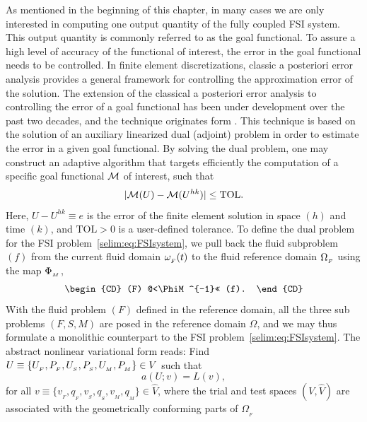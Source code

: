 As mentioned in the beginning of this chapter, in many cases we are
only interested in computing one output quantity of the fully coupled
FSI system. This output quantity is commonly referred to as the goal
functional.  To assure a high level of accuracy of the functional of
interest, the error in the goal functional needs to be controlled. In
finite element discretizations, classic a posteriori error analysis
provides a general framework for controlling the approximation error
of the solution.  The extension of the classical a posteriori error
analysis to controlling the error of a goal functional has been under
development over the past two decades, and the technique originates
form \citet{ErikssonEstepHansboEtAl1995, BeckerRannacher2001}. This
technique is based on the solution of an auxiliary linearized dual
(adjoint) problem in order to estimate the error in a given goal
functional. By solving the dual problem, one may construct an adaptive
algorithm that targets efficiently the computation of a specific goal
functional $\mathcal{M}$ of interest, such that
\begin{equation}
  \label{selim:eq:goalTOL}
|\mathcal{M}(U)-\mathcal{M}(U^{hk})| \leq \mathrm{TOL}.
\end{equation}
Here, $ U-U^{hk} \equiv e$ is the error of the finite element solution
in space $(h)$ and time $(k)$, and $\mathrm{TOL}>0$ is a user-defined
tolerance.  To define the dual problem for the FSI
problem~\eqref{selim:eq:FSIsystem}, we pull back the fluid subproblem
$(f)$ from the current fluid domain $\omega_{_{F}}(t)$ to the fluid reference
domain $\Omega_{_{F}}$ using the map $\Phi_{_{M}}$,
\begin{equation}
  \label{selim:eq:pullback}
  \begin{CD}
    (F) @<\PhiM^{-1}<< (f).
  \end{CD}
\end{equation}
With the fluid problem $(F)$ defined in the reference domain, all the
three sub problems $(F,S,M)$ are posed in the reference domain
$\Omega$, and we may thus formulate a monolithic counterpart to the
FSI problem~\eqref{selim:eq:FSIsystem}. The abstract nonlinear
variational form reads: Find $U\equiv \{ U_{_{F}}, P_{_{F}}, U_{_{S}}, P_{_{S}}, U_{_{M}},
P_{_{M}} \}\in V$ such that
\begin{equation}
\label{selim:eq:monolithic}
a(U;v) = L(v),
\end{equation}
for all $v\equiv \{ v_{_{F}}, q_{_{F}}, v_{_{S}}, q_{_{S}}, v_{_{M}}, q_{_{M}}
\}\in\hat{V}$, where the trial and test spaces $(V,\hat{V})$ are
associated with the geometrically conforming parts of $\Omega_{_{F}}$
